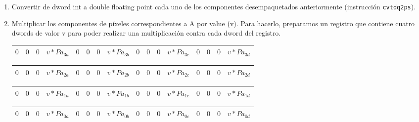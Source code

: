 \begin{enumerate}
\begin{tabular}{| g | g | g | g | g | g | g | g | g | g | g | g | g | g | g | g |}
\hline
$0$ & $0$ & $0$ & $Pb_{1a}$ & $0$ & $0$ & $0$ & $Pb_{1b}$ & $0$ & $0$ & $0$ & $Pb_{1c}$ & $0$ & $0$ & $0$ & $Pb_{1d}$\\ 
\hline
\end{tabular}

\begin{tabular}{| g | g | g | g | g | g | g | g | g | g | g | g | g | g | g | g |}
\hline
$0$ & $0$ & $0$ & $Pb_{0a}$ & $0$ & $0$ & $0$ & $Pb_{0b}$ & $0$ & $0$ & $0$ & $Pb_{0c}$ & $0$ & $0$ & $0$ & $Pb_{0d}$ \\ 
\hline
\end{tabular}

\item Convertir de dword int a double floating point cada uno de los componentes desempaquetados anteriormente (instrucción \texttt{cvtdq2ps}).
\item Multiplicar los componentes de píxeles correspondientes a A por value (v). Para hacerlo, preparamos un registro que contiene cuatro dwords de valor v para poder realizar una multiplicación contra cada dword del registro.

\begin{tabular}{| o | o | o | o | o | o | o | o | o | o | o | o | o | o | o | o |} %
\hline
$0$ & $0$ & $0$ & $v * Pa_{3a}$ & $0$ & $0$ & $0$ & $v * Pa_{3b}$ & $0$ & $0$ & $0$ & $v * Pa_{3c}$ & $0$ & $0$ & $0$ & $v * Pa_{3d}$ \\ 
\hline
\end{tabular}

\begin{tabular}{| o | o | o | o | o | o | o | o | o | o | o | o | o | o | o | o |} %
\hline
$0$ & $0$ & $0$ & $v * Pa_{2a}$ & $0$ & $0$ & $0$ & $v * Pa_{2b}$ & $0$ & $0$ & $0$ & $v * Pa_{2c}$ & $0$ & $0$ & $0$ & $v * Pa_{2d}$ \\ 
\hline
\end{tabular}

\begin{tabular}{| o | o | o | o | o | o | o | o | o | o | o | o | o | o | o | o |} %
\hline
$0$ & $0$ & $0$ & $v * Pa_{1a}$ & $0$ & $0$ & $0$ & $v * Pa_{1b}$ & $0$ & $0$ & $0$ & $v * Pa_{1c}$ & $0$ & $0$ & $0$ & $v * Pa_{1d}$\\ 
\hline
\end{tabular}

\begin{tabular}{| o | o | o | o | o | o | o | o | o | o | o | o | o | o | o | o |} %
\hline
$0$ & $0$ & $0$ & $v * Pa_{0a}$ & $0$ & $0$ & $0$ & $v * Pa_{0b}$ & $0$ & $0$ & $0$ & $v * Pa_{0c}$ & $0$ & $0$ & $0$ & $v * Pa_{0d}$ \\ 
\hline
\end{tabular}


\end{enumerate}
